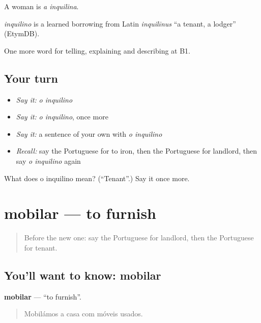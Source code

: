 A woman is \emph{a inquilina}.

\begin{cousinweb}
\emph{inquilino} is a learned borrowing from Latin \emph{inquilīnus} \textquotedblleft{}a tenant, a lodger\textquotedblright{} (EtymDB).
\end{cousinweb}

\begin{grammarlens}[title={What you've built}]
One more word for telling, explaining and describing at B1.
\end{grammarlens}

\subsection*{Your turn}
\begin{itemize}
\raggedright
  \item \emph{Say it:} \emph{o inquilino}
  \item \emph{Say it:} \emph{o inquilino}, once more
  \item \emph{Say it:} a sentence of your own with \emph{o inquilino}
  \item \emph{Recall:} say the Portuguese for to iron, then the Portuguese for landlord, then say \emph{o inquilino} again
\end{itemize}

\begin{tcolorbox}[breakable,colback=teal!4,colframe=teal!35!black,title={Before you move on}]
What does o inquilino mean? (\textquotedblleft{}Tenant\textquotedblright{}.) Say it once more.
\end{tcolorbox}
\section[mobilar]{mobilar — to furnish}

\label{lesson:PT-C530-mobilar}



\begin{quote}
Before the new one: say the Portuguese for landlord, then the Portuguese for tenant.
\end{quote}

\subsection*{You'll want to know: mobilar}
\textbf{mobilar} — \textquotedblleft{}to furnish\textquotedblright{}.

\begin{quote}
Mobilámos a casa com móveis usados.
\end{quote}

